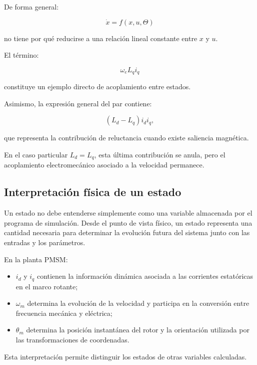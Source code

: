 De forma general:

\begin{equation}
\dot{x}=f(x,u,\Theta)
\end{equation}

no tiene por qué reducirse a una relación lineal constante entre $x$ y $u$.

El término:

\begin{equation}
\omega_eL_qi_q
\end{equation}

constituye un ejemplo directo de acoplamiento entre estados.

Asimismo, la expresión general del par contiene:

\begin{equation}
(L_d-L_q)i_di_q,
\end{equation}

que representa la contribución de reluctancia cuando existe saliencia magnética.

En el caso particular $L_d=L_q$, esta última contribución se anula, pero el acoplamiento electromecánico asociado a la velocidad permanece.

\subsection{Interpretación física de un estado}

Un estado no debe entenderse simplemente como una variable almacenada por el programa de simulación. Desde el punto de vista físico, un estado representa una cantidad necesaria para determinar la evolución futura del sistema junto con las entradas y los parámetros.

En la planta PMSM:

\begin{itemize}
    \item $i_d$ y $i_q$ contienen la información dinámica asociada a las corrientes estatóricas en el marco rotante;
    \item $\omega_m$ determina la evolución de la velocidad y participa en la conversión entre frecuencia mecánica y eléctrica;
    \item $\theta_m$ determina la posición instantánea del rotor y la orientación utilizada por las transformaciones de coordenadas.
\end{itemize}

Esta interpretación permite distinguir los estados de otras variables calculadas.

